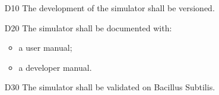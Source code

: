 \begin{enumerate}
  \item[D10] The development of the simulator shall be versioned.
  \item[D20] The simulator shall be documented with:
  \begin{itemize}
    \item a user manual;
    \item a developer manual.
  \end{itemize}
  \item[D30] The simulator shall be validated on Bacillus Subtilis.
\end{enumerate}


